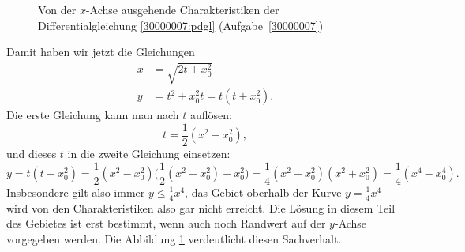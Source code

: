 \begin{loesung}
\begin{figure}
\begin{center}
\end{center}
\caption{Von der $x$-Achse ausgehende Charakteristiken der
Differentialgleichung \eqref{30000007:pdgl} (Aufgabe~\ref{30000007})
\label{30000007:chardom}}
\end{figure}
Damit haben wir jetzt die Gleichungen
\begin{align*}
x&=\sqrt{2t+x_0^2}\\
y&=t^2+x_0^2t = t(t+x_0^2).
\end{align*}
Die erste Gleichung kann man nach $t$ auflösen:
\[
t=\frac12(x^2-x_0^2),
\]
und dieses $t$ in die zweite Gleichung einsetzen:
\begin{equation}
y=t(t+x_0^2)=\frac12(x^2-x_0^2)\biggl(\frac12(x^2-x_0^2)+x_0^2\biggr)
=\frac14(x^2-x_0^2)(x^2+x_0^2)=\frac14(x^4-x_0^4).
\label{30000007:char}
\end{equation}
Insbesondere gilt also immer $y\le\frac14x^4$, das Gebiet oberhalb
der Kurve $y=\frac14x^4$ wird von den Charakteristiken also gar nicht
erreicht. Die Lösung in diesem Teil des Gebietes ist erst bestimmt,
wenn auch noch Randwert auf der $y$-Achse vorgegeben werden. Die
Abbildung \ref{30000007:chardom} verdeutlicht diesen Sachverhalt.
\end{loesung}

